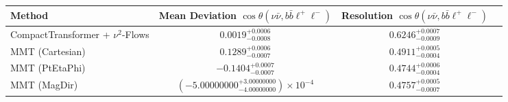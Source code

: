     \begin{tabular}{lccc}
        \toprule
        Method & Mean Deviation $\cos\theta(\nu\bar{\nu}, b\bar{b}\ell^+\ell^-)$ & Resolution $\cos\theta(\nu\bar{\nu}, b\bar{b}\ell^+\ell^-)$ \\
        \midrule
        CompactTransformer + $\nu^2$-Flows & $0.0019^{+0.0006}_{-0.0008}$ & $0.6246^{+0.0007}_{-0.0009}$ \\
        MMT (Cartesian) & $0.1289^{+0.0006}_{-0.0007}$ & $0.4911^{+0.0005}_{-0.0004}$ \\
        MMT (PtEtaPhi) & $-0.1404^{+0.0007}_{-0.0007}$ & $0.4744^{+0.0006}_{-0.0004}$ \\
        MMT (MagDir) & $(-5.00000000^{+3.00000000}_{-4.00000000})\times 10^{-4}$ & $0.4757^{+0.0005}_{-0.0007}$ \\
        \bottomrule
    \end{tabular}